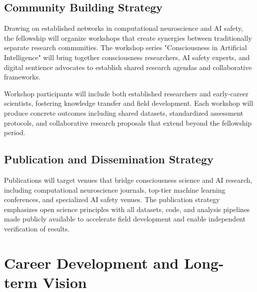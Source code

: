 \documentclass[11pt,a4paper]{article}
\begin{document}
    \subsection{Community Building Strategy}
    
    Drawing on established networks in computational neuroscience and AI safety, the fellowship will organize workshops that create synergies between traditionally separate research communities. The workshop series "Consciousness in Artificial Intelligence" will bring together consciousness researchers, AI safety experts, and digital sentience advocates to establish shared research agendas and collaborative frameworks.
    
    Workshop participants will include both established researchers and early-career scientists, fostering knowledge transfer and field development. Each workshop will produce concrete outcomes including shared datasets, standardized assessment protocols, and collaborative research proposals that extend beyond the fellowship period.
    
    \subsection{Publication and Dissemination Strategy}
    
    Publications will target venues that bridge consciousness science and AI research, including computational neuroscience journals, top-tier machine learning conferences, and specialized AI safety venues. The publication strategy emphasizes open science principles with all datasets, code, and analysis pipelines made publicly available to accelerate field development and enable independent verification of results.
\section{Career Development and Long-term Vision}
\label{sec:career}


\end{document}
